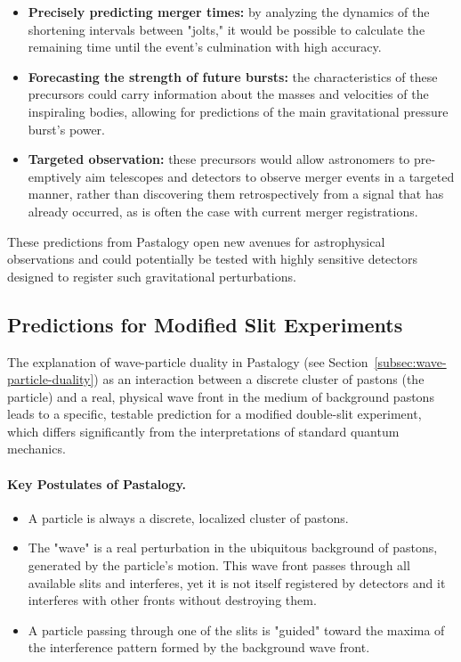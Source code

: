 \documentclass[pdflatex,sn-mathphys-num,referee]{sn-jnl}
\begin{document}
\begin{enumerate}
    \begin{itemize}
        \item \textbf{Precisely predicting merger times:} by analyzing the dynamics of the shortening intervals between "jolts," it would be possible to calculate the remaining time until the event's culmination with high accuracy.
        \item \textbf{Forecasting the strength of future bursts:} the characteristics of these precursors could carry information about the masses and velocities of the inspiraling bodies, allowing for predictions of the main gravitational pressure burst's power.
        \item \textbf{Targeted observation:} these precursors would allow astronomers to pre-emptively aim telescopes and detectors to observe merger events in a targeted manner, rather than discovering them retrospectively from a signal that has already occurred, as is often the case with current merger registrations.
    \end{itemize}
\end{enumerate}

These predictions from Pastalogy open new avenues for astrophysical observations and could potentially be tested with highly sensitive detectors designed to register such gravitational perturbations.

\subsection{Predictions for Modified Slit Experiments}\label{subsec:slit-experiments}

The explanation of wave-particle duality in Pastalogy (see Section~\ref{subsec:wave-particle-duality}) as an interaction between a discrete cluster of pastons (the particle) and a real, physical wave front in the medium of background pastons leads to a specific, testable prediction for a modified double-slit experiment, which differs significantly from the interpretations of standard quantum mechanics.

\paragraph{Key Postulates of Pastalogy.}
\begin{itemize}
    \item A particle is always a discrete, localized cluster of pastons.
    \item The "wave" is a real perturbation in the ubiquitous background of pastons, generated by the particle's motion. This wave front passes through all available slits and interferes, yet it is not itself registered by detectors and it interferes with other fronts without destroying them.
    \item A particle passing through one of the slits is "guided" toward the maxima of the interference pattern formed by the background wave front.
\end{itemize}
\end{document}
